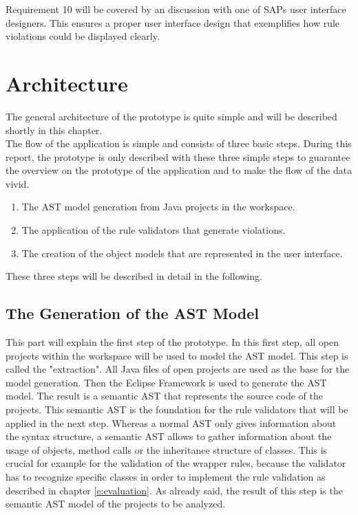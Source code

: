 Requirement 10 will be covered by an discussion with one of SAPs user interface designers. This ensures a proper user interface design that exemplifies how rule violations could be displayed clearly.
\\

\section{Architecture}
\label{p:architecture}
The general architecture of the prototype is quite simple and will be described shortly in this chapter. 
\\

The flow of the application is simple and consists of three basic steps. During this report, the prototype is only described with these three simple steps to guarantee the overview on the prototype of the application and to make the flow of the data vivid.

\begin{enumerate}
  \item The \ac{AST} model generation from Java projects in the workspace.
  \item The application of the rule validators that generate violations.
  \item The creation of the object models that are represented in the user interface. 
\end{enumerate}

These three steps will be described in detail in the following. 

\subsection*{The Generation of the AST Model}
This part will explain the first step of the prototype. In this first step, all open projects within the workspace will be used to model the \ac{AST} model. This step is called the "extraction". All Java files of open projects are used as the base for the model generation. Then the Eclipse Framework is used to generate the  \ac{AST} model. The result is a semantic \ac{AST} that represents the source code of the projects. This semantic \ac{AST}  is the foundation for the rule validators that will be applied in the next step. Whereas a normal \ac{AST} only gives information about the syntax structure, a semantic \ac{AST} allows to gather information about the usage of objects, method calls or the inheritance structure of classes. This is crucial for example for the validation of the wrapper rules, because the validator has to recognize specific classes in order to implement the rule validation as described in chapter \ref{e:evaluation}. As already said, the result of this step is the semantic \ac{AST} model of the projects to be analyzed. 

